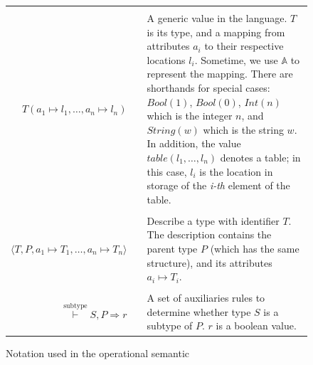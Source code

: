 \begin{figure}
\begin{mdframed}[innermargin=0.3cm, outermargin=0.3cm]
{\begin{tabular}{rcl}
& & \\
$T(a_1 \mapsto l_1, \dots, a_n \mapsto l_n)$ & & \parbox[t]{8cm}{A generic value in the language. $T$ is its type, and a mapping from attributes $a_i$ to their respective locations $l_i$. Sometime, we use $\mathbb{A}$ to represent the mapping. There are shorthands for special cases: $Bool(1)$, $Bool(0)$, $Int(n)$ which is the integer $n$, and $String(w)$ which is the string $w$. In addition, the value $table(l_1,\dots,l_n)$ denotes a table; in this case, $l_i$ is the location in storage of the \textit{i-th} element of the table. } \\ 
& & \\
$\langle T, P, a_1 \mapsto T_1, \dots, a_n \mapsto T_n \rangle$ & & \parbox[t]{8cm}{Describe a type with identifier $T$. The description contains the parent type $P$ (which has the same structure), and its attributes $a_i \mapsto T_i$. } \\
& & \\ 
$\overset{\operatorname{subtype}}{\vdash} S, P \Rightarrow r$ & & \parbox[t]{8cm}{A set of auxiliaries rules to determine whether type $S$ is a subtype of $P$. $r$ is a boolean value.} 
\end{tabular} 

}

\end{mdframed}
\caption{Notation used in the operational semantic}\label{fig:notation-for-operational-semantic}
\end{figure}

\renewcommand{\inference}[3][]{%
  \begin{array}[b]{@{}c@{}c@{}}
    \smash{\raisebox{-.5\normalbaselineskip}{{\scriptsize #1}}} & 
      \begin{array}[b]{l}
        #2
      \end{array} \\
      \cline{2-2}
    & \begin{array}[t]{c}
        #3
      \end{array}
  \end{array}
}

\mathlig{->}{\mapsto}
\mathlig{|-}{\vdash}
\mathlig{=>}{\Rightarrow}

\mathligson

